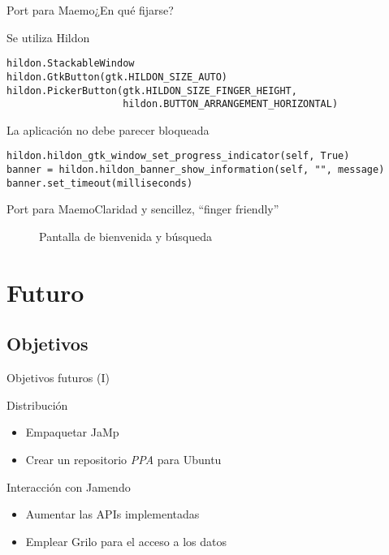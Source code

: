 \documentclass{beamer}
\begin{document}
\begin{frame}[fragile]{Port para Maemo}{¿En qué fijarse?}
\begin{block}{Se utiliza Hildon}
\scriptsize{
\begin{verbatim}
hildon.StackableWindow
hildon.GtkButton(gtk.HILDON_SIZE_AUTO)
hildon.PickerButton(gtk.HILDON_SIZE_FINGER_HEIGHT,
                    hildon.BUTTON_ARRANGEMENT_HORIZONTAL)
\end{verbatim}
}
\end{block}
\pause
\begin{block}{La aplicación no debe parecer bloqueada}
\scriptsize{
\begin{verbatim}
hildon.hildon_gtk_window_set_progress_indicator(self, True)
banner = hildon.hildon_banner_show_information(self, "", message)
banner.set_timeout(milliseconds)
\end{verbatim}}
\end{block}
\end{frame}

\begin{frame}{Port para Maemo}{Claridad y sencillez, ``finger friendly''}
\begin{center}
\begin{figure}
\hskip0.1cm
\caption{Pantalla de bienvenida y búsqueda}
\end{figure}
\end{center}
\end{frame}

\section{Futuro}

\subsection{Objetivos}

\begin{frame}{Objetivos futuros (I)}
\begin{block}{Distribución}
\begin{itemize}
  \item Empaquetar JaMp
  \item Crear un repositorio {\it PPA} para Ubuntu
\end{itemize}
\end{block}
\begin{block}{Interacción con Jamendo}
\begin{itemize}
  \item Aumentar las APIs implementadas
  \item Emplear Grilo para el acceso a los datos
\end{itemize}
\end{block}
\end{frame}
\end{document}
